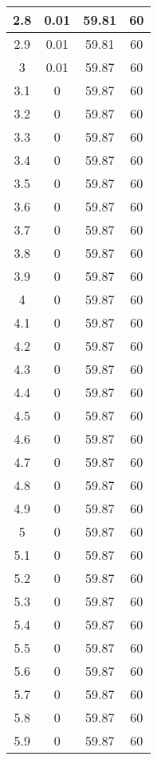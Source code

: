 \begin{longtable}[c]{|c|c|c|c|}
2.8 & 	0.01 & 	59.81 & 	60 \\ \hline 
2.9 & 	0.01 & 	59.81 & 	60 \\ \hline 
3   & 	0.01 & 	59.87 & 	60 \\ \hline 
3.1 & 	0    & 	59.87 & 	60 \\ \hline 
3.2 & 	0    & 	59.87 & 	60 \\ \hline 
3.3 & 	0    & 	59.87 & 	60 \\ \hline 
3.4 & 	0    & 	59.87 & 	60 \\ \hline 
3.5 & 	0    & 	59.87 & 	60 \\ \hline 
3.6 & 	0    & 	59.87 & 	60 \\ \hline 
3.7 & 	0    & 	59.87 & 	60 \\ \hline 
3.8 & 	0    & 	59.87 & 	60 \\ \hline 
3.9 & 	0    & 	59.87 & 	60 \\ \hline 
4   & 	0    & 	59.87 & 	60 \\ \hline 
4.1 & 	0    & 	59.87 & 	60 \\ \hline 
4.2 & 	0    & 	59.87 & 	60 \\ \hline 
4.3 & 	0    & 	59.87 & 	60 \\ \hline 
4.4 & 	0    & 	59.87 & 	60 \\ \hline 
4.5 & 	0    & 	59.87 & 	60 \\ \hline 
4.6 & 	0    & 	59.87 & 	60 \\ \hline 
4.7 & 	0    & 	59.87 & 	60 \\ \hline 
4.8 & 	0    & 	59.87 & 	60 \\ \hline 
4.9 & 	0    & 	59.87 & 	60 \\ \hline 
5   & 	0    & 	59.87 & 	60 \\ \hline 
5.1 & 	0    & 	59.87 & 	60 \\ \hline 
5.2 & 	0    & 	59.87 & 	60 \\ \hline 
5.3 & 	0    & 	59.87 & 	60 \\ \hline 
5.4 & 	0    & 	59.87 & 	60 \\ \hline 
5.5 & 	0    & 	59.87 & 	60 \\ \hline 
5.6 & 	0    & 	59.87 & 	60 \\ \hline 
5.7 & 	0    & 	59.87 & 	60 \\ \hline 
5.8 & 	0    & 	59.87 & 	60 \\ \hline 
5.9 & 	0    & 	59.87 & 	60 \\ \hline 

  \end{longtable}

